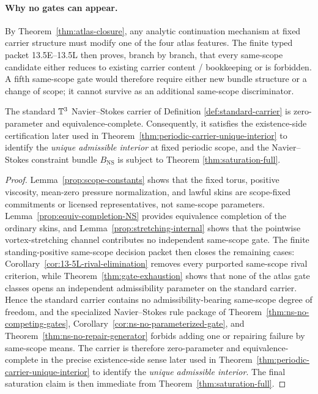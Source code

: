 \paragraph{Why no gates can appear.}
By Theorem~\ref{thm:atlas-closure}, any analytic continuation mechanism at fixed carrier structure
must modify one of the four atlas features. The finite typed packet
13.5E--13.5L then proves, branch by branch, that every same-scope candidate either reduces to
existing carrier content / bookkeeping or is forbidden. A fifth same-scope gate would therefore
require either new bundle structure or a change of scope; it cannot survive as an additional
same-scope discriminator.
\begin{theorem}\label{thm:ns-zero-parameter}
The standard $\mathbb{T}^3$ Navier--Stokes carrier of Definition \ref{def:standard-carrier} is
zero-parameter and equivalence-complete. Consequently, it satisfies the existence-side certification
later used in Theorem~\ref{thm:periodic-carrier-unique-interior} to identify the \emph{unique admissible interior}
at fixed periodic scope, and the Navier--Stokes constraint bundle $B_{\mathrm{NS}}$ is subject to
Theorem \ref{thm:saturation-full}.
\end{theorem}

\begin{proof}
Lemma~\ref{prop:scope-constants} shows that the fixed torus, positive viscosity, mean-zero pressure
normalization, and lawful skins are scope-fixed commitments or licensed representatives, not
same-scope parameters. Lemma~\ref{prop:equiv-completion-NS} provides equivalence completion of the
ordinary skins, and Lemma~\ref{prop:stretching-internal} shows that the pointwise vortex-stretching
channel contributes no independent same-scope gate. The finite standing-positive same-scope decision packet then closes
the remaining cases: Corollary~\ref{cor:13-5L-rival-elimination} removes every purported same-scope
rival criterion, while Theorem~\ref{thm:gate-exhaustion} shows that none of the atlas gate classes
opens an independent admissibility parameter on the standard carrier. Hence the standard carrier
contains no admissibility-bearing same-scope degree of freedom, and the specialized Navier--Stokes
rule package of Theorem~\ref{thm:ns-no-competing-gates},
Corollary~\ref{cor:ns-no-parameterized-gate}, and Theorem~\ref{thm:ns-no-repair-generator} forbids
adding one or repairing failure by same-scope means. The carrier is therefore zero-parameter and
equivalence-complete in the precise existence-side sense later used in
Theorem~\ref{thm:periodic-carrier-unique-interior} to identify the \emph{unique admissible interior}.
The final saturation claim is then immediate from Theorem~\ref{thm:saturation-full}.
\end{proof}

